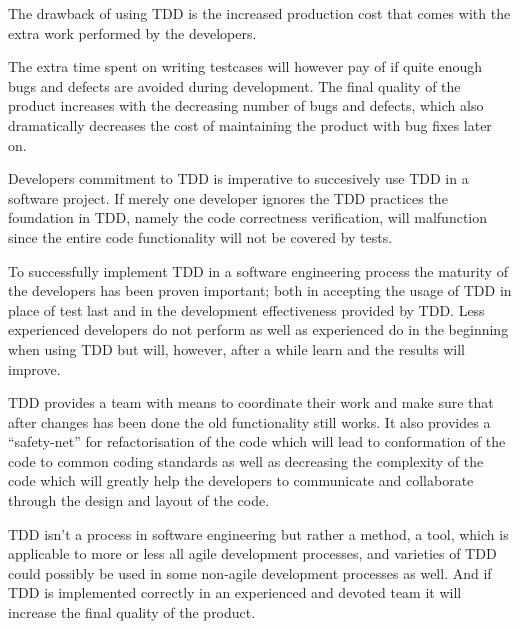 The drawback of using TDD is the increased production cost that comes with the extra work performed by the developers.

The extra time spent on writing testcases will however pay of if quite enough bugs and defects are avoided during development. The final quality of the product increases with the decreasing number of bugs and defects, which also dramatically decreases the cost of maintaining the product with bug fixes later on.

Developers commitment to TDD is imperative to succesively use TDD in a software project. If merely one developer ignores the TDD practices the foundation in TDD, namely the code correctness verification, will malfunction since the entire code functionality will not be covered by tests.

To successfully implement TDD in a software engineering process the maturity of the developers has been proven important; both in accepting the usage of TDD in place of test last and in the development effectiveness provided by TDD.  	
Less experienced developers do not perform as well as experienced do in the beginning when using TDD but will, however, after a while learn and the results will improve.
  	
TDD provides a team with means to coordinate their work and make sure that after changes has been done the old functionality still works. It also provides a ``safety-net'' for refactorisation of the code which will lead to conformation of the code to common coding standards as well as decreasing the complexity of the code which will greatly help the developers to communicate and collaborate through the design and layout of the code.
	  	
TDD isn't a process in software engineering but rather a method, a tool, which is applicable to more or less all agile development processes, and varieties of TDD could possibly be used in some non-agile development processes as well. And if TDD is implemented correctly in an experienced and devoted team it will increase the final quality of the product.  